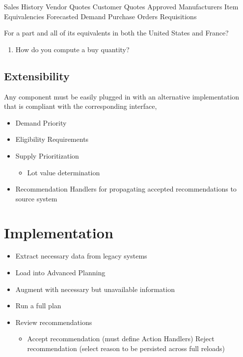 \documentclass[letterpaper,10pt,english]{sphinxmanual}
\begin{document}
Sales History Vendor Quotes Customer Quotes Approved Manufacturers Item
Equivalencies Forecasted Demand Purchase Orders Requisitions

For a part and all of its equivalents in both the United States and
France?
\begin{enumerate}
\item {} 
How do you compute a buy quantity?

\end{enumerate}


\section{Extensibility}
\label{BusinessProcessReengineering:extensibility}
Any component must be easily plugged in with an alternative
implementation that is compliant with the corresponding interface,
\begin{itemize}
\item {} 
Demand Priority

\item {} 
Eligibility Requirements

\item {} 
Supply Prioritization
\begin{itemize}
\item {} 
Lot value determination

\end{itemize}

\item {} 
Recommendation Handlers for propagating accepted recommendations to
source system

\end{itemize}


\chapter{Implementation}
\label{BusinessProcessReengineering:implementation}\begin{itemize}
\item {} 
Extract necessary data from legacy systems

\item {} 
Load into Advanced Planning

\item {} 
Augment with necessary but unavailable information

\item {} 
Run a full plan

\item {} 
Review recommendations
\begin{itemize}
\item {} 
Accept recommendation (must define Action Handlers) Reject
recommendation (select reason to be persisted across full reloads)

\end{itemize}

\end{itemize}
\end{document}

